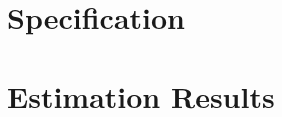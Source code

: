 \documentclass[
]{article}
\begin{document}
\hypertarget{specification}{%
\section{Specification}\label{specification}}

\hypertarget{estimation-results}{%
\section{Estimation Results}\label{estimation-results}}

\providecommand{\docline}[3]{\noalign{\global\setlength{\arrayrulewidth}{#1}}\arrayrulecolor[HTML]{#2}\cline{#3}}

\setlength{\tabcolsep}{0pt}

\renewcommand*{\arraystretch}{0.6}
\end{document}

